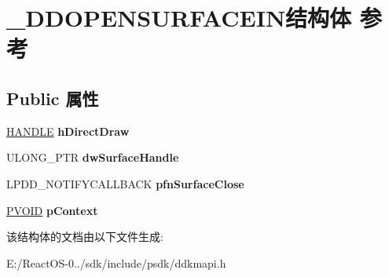 \hypertarget{struct___d_d_o_p_e_n_s_u_r_f_a_c_e_i_n}{}\section{\+\_\+\+D\+D\+O\+P\+E\+N\+S\+U\+R\+F\+A\+C\+E\+I\+N结构体 参考}
\label{struct___d_d_o_p_e_n_s_u_r_f_a_c_e_i_n}
\subsection*{Public 属性}
\begin{DoxyCompactItemize}
\item 
\mbox{\label{struct___d_d_o_p_e_n_s_u_r_f_a_c_e_i_n_a181262f47e3b0e1fa36d1f35a37ea132}} 
\hyperlink{interfacevoid}{H\+A\+N\+D\+LE} {\bfseries h\+Direct\+Draw}
\item 
\mbox{\label{struct___d_d_o_p_e_n_s_u_r_f_a_c_e_i_n_a89be46468e3b9ea329d974efabe67a99}} 
U\+L\+O\+N\+G\+\_\+\+P\+TR {\bfseries dw\+Surface\+Handle}
\item 
\mbox{\label{struct___d_d_o_p_e_n_s_u_r_f_a_c_e_i_n_ad162b27034c800cdb2865205b5dfb321}} 
L\+P\+D\+D\+\_\+\+N\+O\+T\+I\+F\+Y\+C\+A\+L\+L\+B\+A\+CK {\bfseries pfn\+Surface\+Close}
\item 
\mbox{\label{struct___d_d_o_p_e_n_s_u_r_f_a_c_e_i_n_a15cdbe615eca57b954c4828e10c162ae}} 
\hyperlink{interfacevoid}{P\+V\+O\+ID} {\bfseries p\+Context}
\end{DoxyCompactItemize}


该结构体的文档由以下文件生成\+:\begin{DoxyCompactItemize}
\item 
E\+:/\+React\+O\+S-\/0../sdk/include/psdk/ddkmapi.\+h\end{DoxyCompactItemize}
